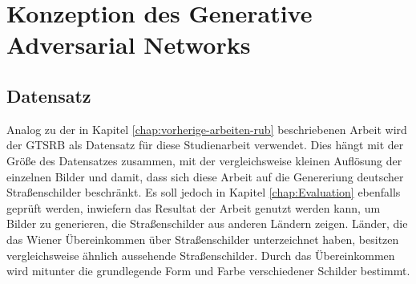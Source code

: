 \chapter{Konzeption des Generative Adversarial Networks}
\label{chap:konzept}
\section{Datensatz}
Analog zu der in Kapitel \ref{chap:vorherige-arbeiten-rub} beschriebenen Arbeit wird der \ac{GTSRB} als Datensatz für diese Studienarbeit verwendet. Dies hängt mit der Größe des Datensatzes zusammen, mit der vergleichsweise kleinen Auflösung der einzelnen Bilder und damit, dass sich diese Arbeit auf die Genereriung deutscher Straßenschilder beschränkt. Es soll jedoch in Kapitel \ref{chap:Evaluation} ebenfalls geprüft werden, inwiefern das Resultat der Arbeit genutzt werden kann, um Bilder zu generieren, die Straßenschilder aus anderen Ländern zeigen. Länder, die das Wiener Übereinkommen über Straßenschilder unterzeichnet haben, besitzen vergleichsweise ähnlich aussehende Straßenschilder. Durch das Übereinkommen wird mitunter die grundlegende Form und Farbe verschiedener Schilder bestimmt. \cite{GTSRB} \cite{vienna-convention}

